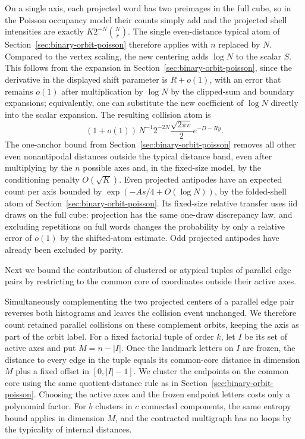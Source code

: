 On a single axis, each projected word has two preimages in the full cube, so in the Poisson occupancy model their counts simply add and the projected shell intensities are exactly \(K2^{-N}\binom Nr\). The single even-distance typical atom of Section~\ref{sec:binary-orbit-poisson} therefore applies with \(n\) replaced by \(N\). Compared to the vertex scaling, the new centering adds \(\log N\) to the scalar \(S\). This follows from the expansion in Section~\ref{sec:binary-orbit-poisson}, since the derivative in the displayed shift parameter is \(R+o(1)\), with an error that remains \(o(1)\) after multiplication by \(\log N\) by the clipped-sum and boundary expansions; equivalently, one can substitute the new coefficient of \(\log N\) directly into the scalar expansion. The resulting collision atom is
\[
 (1+o(1))\,N^{-1}2^{-2N}\frac{\sqrt{2\pi v}}2e^{-D-Ry}.
\]
The one-anchor bound from Section~\ref{sec:binary-orbit-poisson} removes all other even nonantipodal distances outside the typical distance band, even after multiplying by the \(n\) possible axes and, in the fixed-size model, by the conditioning penalty \(O(\sqrt K)\). Even projected antipodes have an expected count per axis bounded by \(\exp(-As/4+O(\log N))\), by the folded-shell atom of Section~\ref{sec:binary-orbit-poisson}. Its fixed-size relative transfer uses iid draws on the full cube: projection has the same one-draw discrepancy law, and excluding repetitions on full words changes the probability by only a relative error of \(o(1)\) by the shifted-atom estimate. Odd projected antipodes have already been excluded by parity.

Next we bound the contribution of clustered or atypical tuples of parallel edge pairs by restricting to the common core of coordinates outside their active axes.

Simultaneously complementing the two projected centers of a parallel edge pair reverses both histograms and leaves the collision event unchanged. We therefore count retained parallel collisions on these complement orbits, keeping the axis as part of the orbit label. For a fixed factorial tuple of order \(k\), let \(I\) be its set of active axes and put \(M=n-|I|\). Once the landmark letters on \(I\) are frozen, the distance to every edge in the tuple equals its common-core distance in dimension \(M\) plus a fixed offset in \([0,|I|-1]\). We cluster the endpoints on the common core using the same quotient-distance rule as in Section~\ref{sec:binary-orbit-poisson}. Choosing the active axes and the frozen endpoint letters costs only a polynomial factor. For \(b\) clusters in \(c\) connected components, the same entropy bound applies in dimension \(M\), and the contracted multigraph has no loops by the typicality of internal distances.


